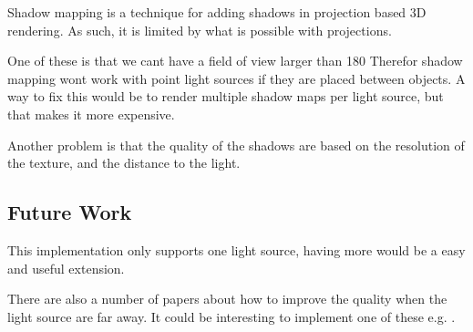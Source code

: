 Shadow mapping is a technique for adding shadows in projection based
3D rendering. As such, it is limited by what is possible with
projections.

One of these is that we cant have a field of view larger than 180
Therefor shadow mapping wont work with point light sources if they are
placed between objects. A way to fix this would be to render multiple
shadow maps per light source, but that makes it more expensive.

Another problem is that the quality of the shadows are based on the
resolution of the texture, and the distance to the light.

\subsection{Future Work}

This implementation only supports one light source, having more would
be a easy and useful extension.

There are also a number of papers about how to improve the quality
when the light source are far away. It could be interesting to
implement one of these e.g. \citep{casc}.

